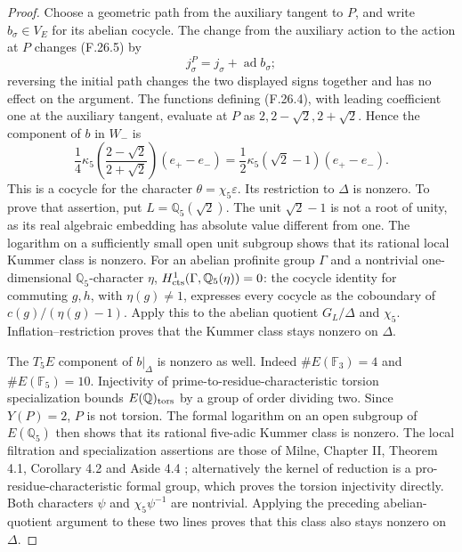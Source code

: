 \begin{proof}
Choose a geometric path from the auxiliary tangent to $P$,
and write $b_\sigma\in V_E$ for its abelian cocycle.
The change from the auxiliary action to the action at $P$
changes (F.26.5) by
\[
                    j_\sigma^P=j_\sigma+\operatorname{ad}b_\sigma;
                                                               \tag{F.26.7}
\]
reversing the initial path changes the two displayed signs
together and has no effect on the argument.
The functions defining (F.26.4), with leading coefficient
one at the auxiliary tangent, evaluate at $P$ as
$2,2-\sqrt2,2+\sqrt2$. Hence the component of $b$ in $W_-$ is
\[
 \frac14\kappa_5\!\left(\frac{2-\sqrt2}{2+\sqrt2}\right)
       (e_+-e_-)
    =\frac12\kappa_5(\sqrt2-1)(e_+-e_-).                    \tag{F.26.8}
\]
This is a cocycle for the character
$\theta=\chi_5\varepsilon$.
Its restriction to $\Delta$ is nonzero.
To prove that assertion, put $L=\mathbb Q_5(\sqrt2)$.
The unit $\sqrt2-1$ is not a root of unity, as its real
algebraic embedding has absolute value different from one.
The logarithm on a sufficiently small open unit subgroup
shows that its rational local Kummer class is nonzero.
For an abelian profinite group $\Gamma$ and a nontrivial
one-dimensional $\mathbb Q_5$-character $\eta$,
$H^1_{\rm cts}(\Gamma,\mathbb Q_5(\eta))=0$:
the cocycle identity for commuting $g,h$, with
$\eta(g)\ne1$, expresses every cocycle as the coboundary of
$c(g)/(\eta(g)-1)$.
Apply this to the abelian quotient $G_L/\Delta$ and $\chi_5$.
Inflation--restriction proves that the Kummer class stays
nonzero on $\Delta$.

The $T_5E$ component of $b|_\Delta$ is nonzero as well.
Indeed $\#E(\mathbb F_3)=4$ and $\#E(\mathbb F_5)=10$.
Injectivity of prime-to-residue-characteristic torsion
specialization bounds $E(\mathbb Q)_{\rm tors}$ by a group
of order dividing two. Since $Y(P)=2$, $P$ is not torsion.
The formal logarithm on an open subgroup of $E(\mathbb Q_5)$
then shows that its rational five-adic Kummer class is
nonzero. The local filtration and specialization assertions
are those of Milne, Chapter II, Theorem 4.1, Corollary 4.2
and Aside 4.4 \cite{BC_MilneEC2021}; alternatively the kernel
of reduction is a pro-residue-characteristic formal group,
which proves the torsion injectivity directly.
Both characters $\psi$ and $\chi_5\psi^{-1}$
are nontrivial. Applying the preceding abelian-quotient
argument to these two lines proves that this class also
stays nonzero on $\Delta$.


\end{proof}
